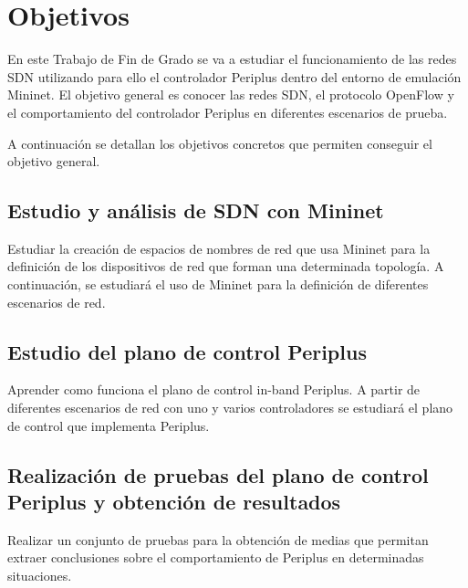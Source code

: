 \documentclass[a4paper, 12pt]{book}
\begin{document}
	\cleardoublepage %
	\chapter{Objetivos} %
	\label{chap:objetivos} %
	
	En este Trabajo de Fin de Grado se va a estudiar el funcionamiento de las redes SDN
	utilizando para ello el controlador Periplus dentro
	del entorno de emulación Mininet. El objetivo
	general es conocer las redes SDN, el protocolo
	OpenFlow y el comportamiento del controlador
	Periplus en diferentes escenarios de prueba. 
	
	A continuación se detallan los objetivos concretos que permiten conseguir el objetivo general.
	
	\section{Estudio y análisis de SDN con Mininet} %
	\label{sec:objetivo-mininet} %
	
	Estudiar la creación de espacios de nombres de red que usa Mininet para la definición
	de los dispositivos de red que forman una determinada topología. A continuación, se estudiará el
	uso de Mininet para la	definición de diferentes escenarios de	red.
		
	
	\section{Estudio del plano de control Periplus}
	\label{sec:objetivos-periplus}
	
	Aprender como funciona el plano de control in-band Periplus. A partir de diferentes escenarios de red con uno y varios controladores se estudiará
	el plano de control que implementa Periplus.
	
	\section{Realización de pruebas del plano de control Periplus y obtención de resultados}
	\label{sec:objetivos-analisis-periplus}
	
	Realizar un conjunto de pruebas para la obtención de medias que permitan extraer conclusiones
	sobre el comportamiento de Periplus	en determinadas	situaciones.
	
\end{document}

